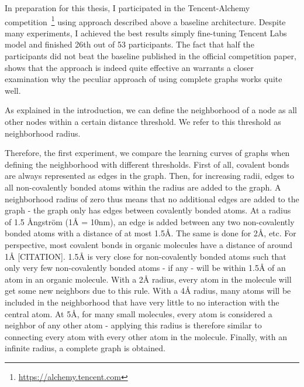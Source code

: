 In preparation for this thesis, I participated in the Tencent-Alchemy competition~\footnote{\url{https://alchemy.tencent.com}} using approach described above a baseline architecture. Despite many experiments, I achieved the best results simply fine-tuning Tencent Labs model and finished 26th out of 53 participants. The fact that half the participants did not beat the baseline published in the official competition paper, shows that the approach is indeed quite effective an warrants a closer examination why the peculiar approach of using complete graphs works quite well.



As explained in the introduction, we can define the neighborhood of a node as all other nodes within a certain distance threshold. We refer to this threshold as neighborhood radius.

Therefore, the first experiment, we compare the learning curves of graphs when defining the neighborhood with different thresholds. First of all, covalent bonds are always represented as edges in the graph. Then, for increasing radii, edges to all non-covalently bonded atoms within the radius are added to the graph. A neighborhood radius of zero thus means that no additional edges are added to the graph - the graph only has edges between covalently bonded atoms. At a radius of 1.5 Ångström (1Å = 10nm), an edge is added between any two non-covalently bonded atoms with a distance of at most 1.5Å. The same is done for 2Å, etc. For perspective, most covalent bonds in organic molecules have a distance of around 1Å [CITATION]. 1.5Å is very close for non-covalently bonded atoms such that only very few non-covalently bonded atoms - if any - will be within 1.5Å of an atom in an organic molecule. With a 2Å radius, every atom in the molecule will get some new neighbors due to this rule. With a 4Å radius, many atoms will be included in the neighborhood that have very little to no interaction with the central atom. At 5Å, for many small molecules, every atom is considered a neighbor of any other atom - applying this radius is therefore similar to connecting every atom with every other atom in the molecule. Finally, with an infinite radius, a complete graph is obtained.


